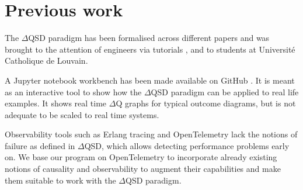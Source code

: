 \section{Previous work}
    The $\Delta$QSD paradigm has been formalised across different papers \cite{myo} \cite{art} and was brought to the attention of engineers via tutorials \cite{dq-tut}, and to students at Université Catholique de Louvain. \cite{dq-ucl} 
    
    A Jupyter notebook workbench has been made available on GitHub \cite{dqsd-wkb}. It is meant as an interactive tool to show how the $\Delta$QSD paradigm can be applied to real life examples. It shows real time $\Delta$Q graphs for typical outcome diagrams, but is not adequate to be scaled to real time systems.
    
    Observability tools such as Erlang tracing \cite{erl-t} and OpenTelemetry \cite{otel-e} lack the notions of failure as defined in $\Delta$QSD, which allows detecting performance problems early on. We base our program on OpenTelemetry to incorporate already existing notions of causality and observability to augment their capabilities and make them suitable to work with the $\Delta$QSD paradigm.
